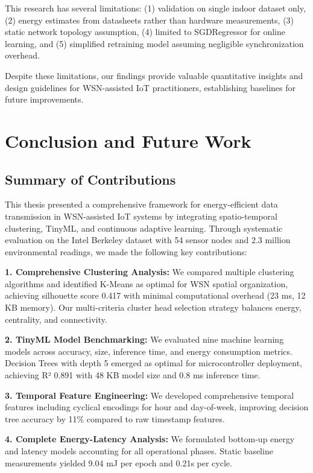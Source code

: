 \documentclass[12pt,a4paper]{article}
\begin{document}
This research has several limitations: (1) validation on single indoor dataset only, (2) energy estimates from datasheets rather than hardware measurements, (3) static network topology assumption, (4) limited to SGDRegressor for online learning, and (5) simplified retraining model assuming negligible synchronization overhead.

Despite these limitations, our findings provide valuable quantitative insights and design guidelines for WSN-assisted IoT practitioners, establishing baselines for future improvements.


\newpage
\section{Conclusion and Future Work}

\subsection{Summary of Contributions}

This thesis presented a comprehensive framework for energy-efficient data transmission in WSN-assisted IoT systems by integrating spatio-temporal clustering, TinyML, and continuous adaptive learning. Through systematic evaluation on the Intel Berkeley dataset with 54 sensor nodes and 2.3 million environmental readings, we made the following key contributions:

\textbf{1. Comprehensive Clustering Analysis:} We compared multiple clustering algorithms and identified K-Means as optimal for WSN spatial organization, achieving silhouette score 0.417 with minimal computational overhead (23 ms, 12 KB memory). Our multi-criteria cluster head selection strategy balances energy, centrality, and connectivity.

\textbf{2. TinyML Model Benchmarking:} We evaluated nine machine learning models across accuracy, size, inference time, and energy consumption metrics. Decision Trees with depth 5 emerged as optimal for microcontroller deployment, achieving R² 0.891 with 48 KB model size and 0.8 ms inference time.

\textbf{3. Temporal Feature Engineering:} We developed comprehensive temporal features including cyclical encodings for hour and day-of-week, improving decision tree accuracy by 11\% compared to raw timestamp features.

\textbf{4. Complete Energy-Latency Analysis:} We formulated bottom-up energy and latency models accounting for all operational phases. Static baseline measurements yielded 9.04 mJ per epoch and 0.21s per cycle.
\end{document}
